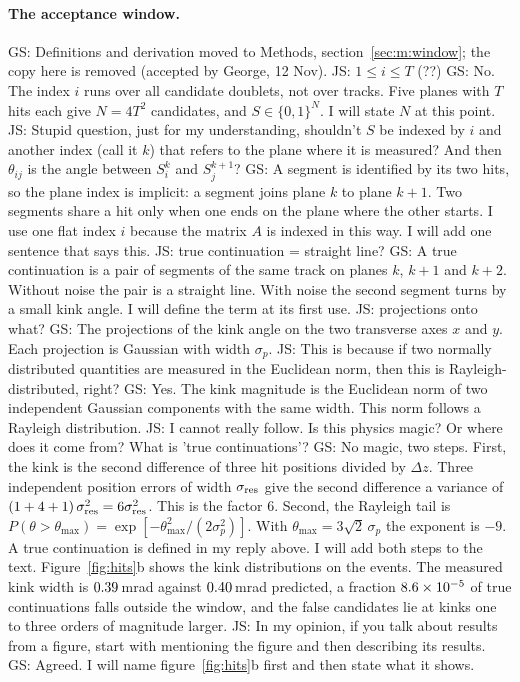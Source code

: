 \documentclass[11pt,a4paper]{article}
\newcommand{\js}[1]{{\color{blue} JS: #1 }}
\newcommand{\gs}[1]{{\color{orange!85!black} GS: #1 }}
\begin{document}
\paragraph{The acceptance window.}
\gs{Definitions and derivation moved to Methods, section~\mbox{\ref{sec:m:window}}; the copy here is removed (accepted by George, 12 Nov).}  \js{$1 \leq i \leq T$ (??)} \gs{No. The index $i$ runs over all candidate doublets, not over tracks. Five planes with $T$ hits each give $N=4T^2$ candidates, and $S\in\{0,1\}^N$. I will state $N$ at this point.  } \js{Stupid question, just for my understanding, shouldn't $S$ be indexed by $i$ and another index (call it $k$) that refers to the plane where it is measured? And then $\theta_{ij}$ is the angle between $S_i^k$ and $S_j^{k+1}$?} \gs{A segment is identified by its two hits, so the plane index is implicit: a segment joins plane $k$ to plane $k+1$. Two segments share a hit only when one ends on the plane where the other starts. I use one flat index $i$ because the matrix $A$ is indexed in this way. I will add one sentence that says this.  }
 \js{true continuation = straight line?} \gs{A true continuation is a pair of segments of the same track on planes $k$, $k+1$ and $k+2$. Without noise the pair is a straight line. With noise the second segment turns by a small kink angle. I will define the term at its first use.  } \js{projections onto what?} \gs{The projections of the kink angle on the two transverse axes $x$ and $y$. Each projection is Gaussian with width $\sigma_p$.  } 
 \js{This is because if two normally distributed quantities are measured in the Euclidean norm, then this is Rayleigh-distributed, right?} \gs{Yes. The kink magnitude is the Euclidean norm of two independent Gaussian components with the same width. This norm follows a Rayleigh distribution.}
 \js{I cannot really follow. Is this physics magic? Or where does it come from? What is 'true continuations'?} \gs{No magic, two steps. First, the kink is the second difference of three hit positions divided by $\Delta z$. Three independent position errors of width $\sigma_{\rm res}$ give the second difference a variance of $(1+4+1)\,\sigma_{\rm res}^2=6\sigma_{\rm res}^2$. This is the factor 6. Second, the Rayleigh tail is $P(\theta>\theta_{\max})=\exp[-\theta_{\max}^2/(2\sigma_p^2)]$. With $\theta_{\max}=3\sqrt2\,\sigma_p$ the exponent is $-9$. A true continuation is defined in my reply above. I will add both steps to the text.  }
Figure~\ref{fig:hits}b shows the kink distributions on the events. The measured kink width is
$0.39$\,mrad against $0.40$\,mrad predicted, a fraction $8.6\times10^{-5}$ of true
continuations falls outside the window, and the false candidates lie at kinks one to three orders
of magnitude larger. \js{In my opinion, if you talk about results from a figure, start with mentioning the figure and then describing its results.} \gs{Agreed. I will name figure~\ref{fig:hits}b first and then state what it shows.  }
\end{document}

